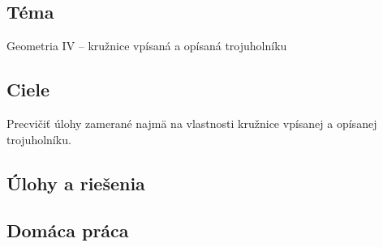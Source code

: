 
\subsection*{Téma}
Geometria IV -- kružnice vpísaná a opísaná trojuholníku

\subsection*{Ciele}
Precvičiť úlohy zamerané najmä na vlastnosti kružnice vpísanej a opísanej trojuholníku.

\subsection*{Úlohy a riešenia}













\subsection*{Domáca práca}







